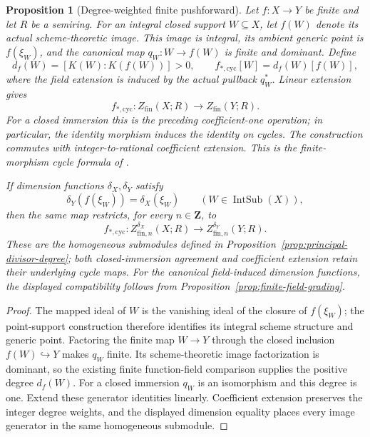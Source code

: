 \documentclass[11pt]{article}
\newtheorem{proposition}[theorem]{Proposition}
\theoremstyle{definition}
\theoremstyle{remark}
\begin{document}
\begin{proposition}[Degree-weighted finite pushforward]
\label{prop:finite-cycle-pushforward}
Let \(f:X\to Y\) be finite and let \(R\) be a semiring.
For an integral closed support \(W\subseteq X\), let \(f(W)\)
denote its actual scheme-theoretic image. This image is integral,
its ambient generic point is \(f(\xi_W)\), and the canonical map
\(q_W:W\to f(W)\) is finite and dominant. Define
\[
 d_f(W)=[K(W):K(f(W))]>0,
 \qquad
 f_{*,\mathrm{cyc}}[W]=d_f(W)[f(W)],
\]
where the field extension is induced by the actual pullback \(q_W^*\).
Linear extension gives
\[
 f_{*,\mathrm{cyc}}:Z_{\mathrm{fin}}(X;R)
       \longrightarrow Z_{\mathrm{fin}}(Y;R).
\]
For a closed immersion this is the preceding coefficient-one operation;
in particular, the identity morphism induces the identity on cycles.
The construction commutes with integer-to-rational coefficient extension.
This is the finite-morphism cycle formula of
\cite{StacksProperCyclePushforward}.

If dimension functions \(\delta_X,\delta_Y\) satisfy
\[
 \delta_Y(f(\xi_W))=\delta_X(\xi_W)
 \qquad(W\in\operatorname{IntSub}(X)),
\]
then the same map restricts, for every \(n\in\mathbf Z\), to
\[
 f_{*,\mathrm{cyc}}:Z^{\delta_X}_{\mathrm{fin},n}(X;R)
       \longrightarrow Z^{\delta_Y}_{\mathrm{fin},n}(Y;R).
\]
These are the homogeneous submodules defined in
Proposition~\ref{prop:principal-divisor-degree}; both closed-immersion
agreement and coefficient extension retain their underlying cycle maps.
For the canonical field-induced dimension functions, the displayed
compatibility follows from Proposition~\ref{prop:finite-field-grading}.
\end{proposition}

\begin{proof}
The mapped ideal of \(W\) is the vanishing ideal of the closure of
\(f(\xi_W)\); the point-support construction therefore identifies
its integral scheme structure and generic point. Factoring the finite
map \(W\to Y\) through the closed inclusion \(f(W)\hookrightarrow Y\)
makes \(q_W\) finite. Its scheme-theoretic image factorization is dominant,
so the existing finite function-field comparison supplies the positive
degree \(d_f(W)\). For a closed immersion \(q_W\) is an isomorphism
and this degree is one. Extend these generator identities linearly.
Coefficient extension preserves the integer degree weights, and the
displayed dimension equality places every image generator in the same
homogeneous submodule.
\end{proof}
\end{document}
